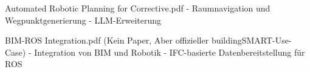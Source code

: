 Automated Robotic Planning for Corrective.pdf \newline
- Raumnavigation und Wegpunktgenerierung \newline
- LLM-Erweiterung \newline

BIM-ROS Integration.pdf (Kein Paper, Aber offizieller buildingSMART-Use-Case) \newline
- Integration von BIM und Robotik \newline
- IFC-basierte Datenbereitstellung für ROS \newline

